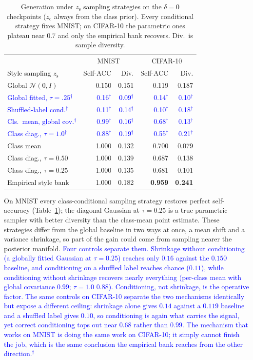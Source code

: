 \documentclass[letterpaper]{article} %
\newcommand{\pj}[1]{\textcolor{blue}{#1$^{\dagger}$}}
\newcommand{\zc}{z_{\mathrm{c}}}
\newcommand{\zs}{z_{\mathrm{s}}}
\begin{document}
\begin{table}[t]
\centering
\small
\setlength{\tabcolsep}{4pt}
\caption{Generation under $\zs$ sampling strategies on the $\delta{=}0$
checkpoints ($\zc$ always from the class prior). Every conditional strategy
fixes MNIST; on CIFAR-10 the parametric ones plateau near $0.7$ and only the
empirical bank recovers. Div.\ is sample diversity.}
\label{tab:sampling}
\begin{tabular}{lrrrr}
\toprule
& \multicolumn{2}{c}{MNIST} & \multicolumn{2}{c}{CIFAR-10} \\
Style sampling $\zs$ & Self-ACC & Div. & Self-ACC & Div. \\
\midrule
Global $\mathcal N(0,I)$ & 0.150 & 0.151 & 0.119 & 0.187 \\
\midrule
\pj{Global fitted, $\tau{=}.25$} & \pj{0.16} & \pj{0.09} & \pj{0.14} & \pj{0.10} \\
\pj{Shuffled-label cond.} & \pj{0.11} & \pj{0.14} & \pj{0.10} & \pj{0.18} \\
\pj{Cls.\ mean, global cov.} & \pj{0.99} & \pj{0.16} & \pj{0.68} & \pj{0.13} \\
\pj{Class diag., $\tau{=}1.0$} & \pj{0.88} & \pj{0.19} & \pj{0.55} & \pj{0.21} \\
\midrule
Class mean & 1.000 & 0.132 & 0.700 & 0.079 \\
Class diag., $\tau{=}0.50$ & 1.000 & 0.139 & 0.687 & 0.138 \\
Class diag., $\tau{=}0.25$ & 1.000 & 0.135 & 0.681 & 0.101 \\
Empirical style bank & 1.000 & 0.182 & \textbf{0.959} & \textbf{0.241} \\
\bottomrule
\end{tabular}
\end{table}

On MNIST every class-conditional sampling strategy restores perfect
self-accuracy (Table~\ref{tab:sampling}); the diagonal Gaussian at
$\tau{=}0.25$ is a true parametric sampler with better diversity than the
class-mean point estimate. These strategies differ from the global baseline
in two ways at once, a mean shift and a variance shrinkage, so part of the
gain could come from sampling nearer the posterior manifold. \pj{Four
controls separate them. Shrinkage without conditioning (a globally fitted
Gaussian at $\tau{=}0.25$) reaches only $0.16$ against the $0.150$ baseline,
and conditioning on a shuffled label reaches chance ($0.11$), while
conditioning without shrinkage recovers nearly everything (per-class mean
with global covariance $0.99$; $\tau{=}1.0$ $0.88$). Conditioning, not
shrinkage, is the operative factor. The same controls on CIFAR-10 separate
the two mechanisms identically but expose a different ceiling: shrinkage
alone gives $0.14$ against a $0.119$ baseline and a shuffled label gives
$0.10$, so conditioning is again what carries the signal, yet correct
conditioning tops out near $0.68$ rather than $0.99$. The mechanism that
works on MNIST is doing the same work on CIFAR-10; it simply cannot finish
the job, which is the same conclusion the empirical bank reaches from the
other direction.}
\end{document}
